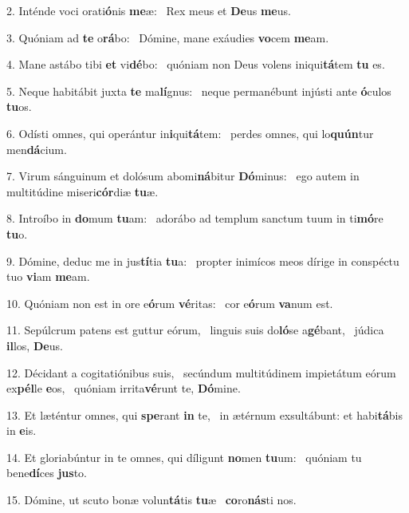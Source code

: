2. Inténde voci orati\textbf{ó}nis \textbf{me}æ: \ast\  Rex meus et \textbf{De}us \textbf{me}us.\

3. Quóniam ad \textbf{te} o\textbf{rá}bo: \ast\  Dómine, mane exáudies \textbf{vo}cem \textbf{me}am.\

4. Mane astábo tibi \textbf{et} vi\textbf{dé}bo: \ast\  quóniam non Deus volens iniqui\textbf{tá}tem \textbf{tu} es.\

5. Neque habitábit juxta \textbf{te} ma\textbf{lí}gnus: \ast\  neque permanébunt injústi ante \textbf{ó}culos \textbf{tu}os.\

6. Odísti omnes, qui operántur in\textbf{i}qui\textbf{tá}tem: \ast\  perdes omnes, qui lo\textbf{quún}tur men\textbf{dá}cium.\

7. Virum sánguinum et dolósum abomi\textbf{ná}bitur \textbf{Dó}minus: \ast\  ego autem in multitúdine miseri\textbf{cór}diæ \textbf{tu}æ.\

8. Introíbo in \textbf{do}mum \textbf{tu}am: \ast\  adorábo ad templum sanctum tuum in ti\textbf{mó}re \textbf{tu}o.\

9. Dómine, deduc me in jus\textbf{tí}tia \textbf{tu}a: \ast\  propter inimícos meos dírige in conspéctu tuo \textbf{vi}am \textbf{me}am.\

10. Quóniam non est in ore e\textbf{ó}rum \textbf{vé}ritas: \ast\  cor e\textbf{ó}rum \textbf{va}num est.\

11. Sepúlcrum patens est guttur eórum, \dag\  linguis suis do\textbf{ló}se a\textbf{gé}bant, \ast\  júdica \textbf{il}los, \textbf{De}us.\

12. Décidant a cogitatiónibus suis, \dag\  secúndum multitúdinem impietátum eórum ex\textbf{pél}le \textbf{e}os, \ast\  quóniam irrita\textbf{vé}runt te, \textbf{Dó}mine.\

13. Et læténtur omnes, qui \textbf{spe}rant \textbf{in} te, \ast\  in ætérnum exsultábunt: et habi\textbf{tá}bis in \textbf{e}is.\

14. Et gloriabúntur in te omnes, qui díligunt \textbf{no}men \textbf{tu}um: \ast\  quóniam tu bene\textbf{dí}ces \textbf{jus}to.\

15. Dómine, ut scuto bonæ volun\textbf{tá}tis \textbf{tu}æ \ast\  \textbf{co}ro\textbf{nás}ti nos.\

